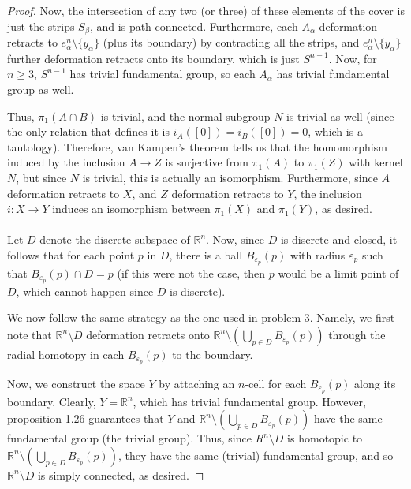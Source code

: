 \documentclass[fontsize=11pt]{scrartcl} %
\numberwithin{equation}{section} %
\numberwithin{figure}{section} %
\numberwithin{table}{section} %
\newcommand{\R}{\mathbb{R}}
\begin{document}
\begin{proof}
    Now, the intersection of any two (or three) of these elements of the cover
    is just the strips $S_{\beta}$, and is path-connected. Furthermore, each
    $A_{\alpha}$ deformation retracts to $e_{\alpha}^n\setminus\{y_{\alpha}\}$
    (plus its boundary) by contracting all the strips, and
    $e_{\alpha}^n\setminus\{y_{\alpha}\}$ further deformation retracts onto its
    boundary, which is just $S^{n-1}$. Now, for $n\geq 3$, $S^{n-1}$ has trivial
    fundamental group, so each $A_{\alpha}$ has trivial fundamental group as
    well.

    Thus, $\pi_1(A\cap B)$ is trivial, and the normal subgroup $N$ is trivial as
    well (since the only relation that defines it is $i_A([0]) = i_B([0]) = 0$,
    which is a tautology). Therefore, van Kampen's theorem tells us that the
    homomorphism induced by the inclusion $A\to Z$ is surjective from $\pi_1(A)$
    to $\pi_1(Z)$ with kernel $N$, but since $N$ is trivial, this is actually an
    isomorphism. Furthermore, since $A$ deformation retracts to $X$, and $Z$
    deformation retracts to $Y$, the inclusion $i:X\to Y$ induces an isomorphism
    between $\pi_1(X)$ and $\pi_1(Y)$, as desired.
    \\
    \\

    Let $D$ denote the discrete subspace of $\R^n$. Now,
    since $D$ is discrete and closed, it follows that for each point $p$ in $D$,
    there is a ball $B_{\varepsilon_p}(p)$ with radius
    $\varepsilon_p$ such that $B_{\varepsilon_p}(p)\cap D = p$ (if this were
    not the case, then $p$ would be a limit point of $D$, which cannot
    happen since $D$ is discrete).

    We now follow the same strategy as the one used in problem 3. Namely, we
    first note that $\R^n\setminus D$ deformation retracts onto $\R^n\setminus
    (\bigcup_{p\in D}B_{\varepsilon_p}(p))$ through the radial homotopy in each
    $B_{\varepsilon_p}(p)$ to the boundary.

    Now, we construct the space $Y$ by attaching an $n$-cell for each
    $B_{\varepsilon_p}(p)$ along its boundary. Clearly, $Y=\R^n$, which has
    trivial fundamental group. However, proposition 1.26 guarantees that $Y$
    and $\R^n\setminus(\bigcup_{p\in D}B_{\varepsilon_p}(p))$ have the same
    fundamental group (the trivial group). Thus, since $R^n\setminus D$ is
    homotopic to $\R^n\setminus(\bigcup_{p\in D}B_{\varepsilon_p}(p))$, they
    have the same (trivial) fundamental group, and so $\R^n\setminus D$ is
    simply connected, as desired.
\end{proof}
\end{document}

